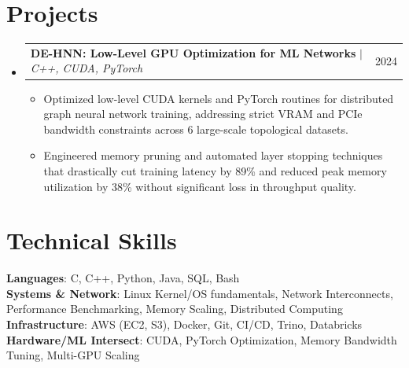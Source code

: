 \documentclass[letterpaper,11pt]{article}
\makeatletter
\newcommand{\resumeItem}[1]{\item\small{{#1 \vspace{-2pt}}}}
\newcommand{\resumeProjectHeading}[2]{
    \item
    \begin{tabular*}{0.97\textwidth}{l@{\extracolsep{\fill}}r}
      \small#1 & #2 \\
    \end{tabular*}\vspace{-7pt}
}
\newcommand{\resumeSubHeadingListStart}{\begin{itemize}[leftmargin=0.15in, label={}]}
\newcommand{\resumeSubHeadingListEnd}{\end{itemize}}
\newcommand{\resumeItemListStart}{\begin{itemize}}
\newcommand{\resumeItemListEnd}{\end{itemize}\vspace{-5pt}}
\makeatother
\begin{document}
\section{Projects}
    \resumeSubHeadingListStart
      \resumeProjectHeading
          {\textbf{DE-HNN: Low-Level GPU Optimization for ML Networks} $|$ \emph{C++, CUDA, PyTorch}}{2024}
          \resumeItemListStart
            \resumeItem{Optimized low-level CUDA kernels and PyTorch routines for distributed graph neural network training, addressing strict VRAM and PCIe bandwidth constraints across 6 large-scale topological datasets.}
            \resumeItem{Engineered memory pruning and automated layer stopping techniques that drastically cut training latency by 89\% and reduced peak memory utilization by 38\% without significant loss in throughput quality.}
          \resumeItemListEnd
    \resumeSubHeadingListEnd

\section{Technical Skills}
 \begin{itemize}[leftmargin=0.15in, label={}]
    \small{\item{
     \textbf{Languages}{: C, C++, Python, Java, SQL, Bash} \\
     \textbf{Systems \& Network}{: Linux Kernel/OS fundamentals, Network Interconnects, Performance Benchmarking, Memory Scaling, Distributed Computing} \\
     \textbf{Infrastructure}{: AWS (EC2, S3), Docker, Git, CI/CD, Trino, Databricks} \\
     \textbf{Hardware/ML Intersect}{: CUDA, PyTorch Optimization, Memory Bandwidth Tuning, Multi-GPU Scaling}
    }}
 \end{itemize}
\end{document}
